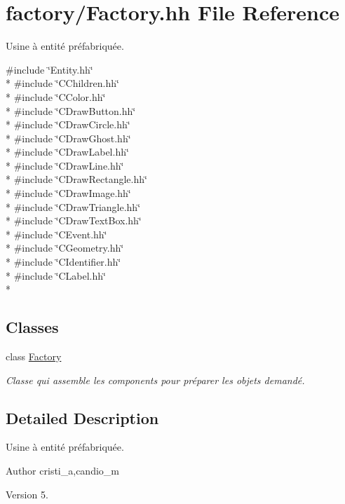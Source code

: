 \hypertarget{_factory_8hh}{}\section{factory/\+Factory.hh File Reference}
\label{_factory_8hh}


Usine à entité préfabriquée.  


{\ttfamily \#include \char`\"{}Entity.\+hh\char`\"{}}\\*
{\ttfamily \#include \char`\"{}C\+Children.\+hh\char`\"{}}\\*
{\ttfamily \#include \char`\"{}C\+Color.\+hh\char`\"{}}\\*
{\ttfamily \#include \char`\"{}C\+Draw\+Button.\+hh\char`\"{}}\\*
{\ttfamily \#include \char`\"{}C\+Draw\+Circle.\+hh\char`\"{}}\\*
{\ttfamily \#include \char`\"{}C\+Draw\+Ghost.\+hh\char`\"{}}\\*
{\ttfamily \#include \char`\"{}C\+Draw\+Label.\+hh\char`\"{}}\\*
{\ttfamily \#include \char`\"{}C\+Draw\+Line.\+hh\char`\"{}}\\*
{\ttfamily \#include \char`\"{}C\+Draw\+Rectangle.\+hh\char`\"{}}\\*
{\ttfamily \#include \char`\"{}C\+Draw\+Image.\+hh\char`\"{}}\\*
{\ttfamily \#include \char`\"{}C\+Draw\+Triangle.\+hh\char`\"{}}\\*
{\ttfamily \#include \char`\"{}C\+Draw\+Text\+Box.\+hh\char`\"{}}\\*
{\ttfamily \#include \char`\"{}C\+Event.\+hh\char`\"{}}\\*
{\ttfamily \#include \char`\"{}C\+Geometry.\+hh\char`\"{}}\\*
{\ttfamily \#include \char`\"{}C\+Identifier.\+hh\char`\"{}}\\*
{\ttfamily \#include \char`\"{}C\+Label.\+hh\char`\"{}}\\*
\subsection*{Classes}
\begin{DoxyCompactItemize}
\item 
class \hyperlink{class_factory}{Factory}
\begin{DoxyCompactList}\small\item\em Classe qui assemble les components pour préparer les objets demandé. \end{DoxyCompactList}\end{DoxyCompactItemize}


\subsection{Detailed Description}
Usine à entité préfabriquée. 

\begin{DoxyAuthor}{Author}
cristi\+\_\+a,candio\+\_\+m 
\end{DoxyAuthor}
\begin{DoxyVersion}{Version}
5. 
\end{DoxyVersion}
